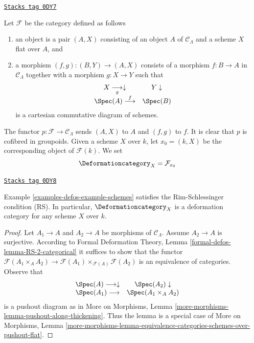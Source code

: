 \begin{example}[Schemes]

\label{examples-defos-example-schemes}
\href{https://stacks.math.columbia.edu/tag/0DY7}{\texttt{Stacks tag 0DY7}}

Let $\mathcal{F}$ be the category defined as follows
\begin{enumerate}
\item an object is a pair $(A, X)$ consisting of an
object $A$ of $\mathcal{C}_\Lambda$ and a scheme $X$ flat over $A$, and
\item a morphism $(f, g) : (B, Y) \to (A, X)$ consists of
a morphism $f : B \to A$ in $\mathcal{C}_\Lambda$ together
with a morphism $g : X \to Y$ such that
$$
\begin{array}{cc}X \underset{g}{\longrightarrow}\downarrow & Y \downarrow \\ \Spec(A) \overset{f}{\longrightarrow} & \Spec(B)\end{array}
$$
is a cartesian commutative diagram of schemes.
\end{enumerate}
The functor $p : \mathcal{F} \to \mathcal{C}_\Lambda$ sends $(A, X)$
to $A$ and $(f, g)$ to $f$. It is clear that $p$ is cofibred in groupoids.
Given a scheme $X$ over $k$, let $x_0 = (k, X)$ be the corresponding object
of $\mathcal{F}(k)$. We set
$$
\Deformationcategory_X = \mathcal{F}_{x_0}
$$
\end{example}

\begin{lemma}[Schemes RS]
\label{examples-defos-lemma-schemes-RS}
\href{https://stacks.math.columbia.edu/tag/0DY8}{\texttt{Stacks tag 0DY8}}

Example \ref{examples-defos-example-schemes}
satisfies the Rim-Schlessinger condition (RS).
In particular, $\Deformationcategory_X$ is a deformation category
for any scheme $X$ over $k$.
\end{lemma}

\begin{proof}
Let $A_1 \to A$ and $A_2 \to A$ be morphisms of $\mathcal{C}_\Lambda$.
Assume $A_2 \to A$ is surjective. According to
Formal Deformation Theory, Lemma
\ref{formal-defos-lemma-RS-2-categorical}
it suffices to show that the functor
$\mathcal{F}(A_1 \times_A A_2) \to
\mathcal{F}(A_1) \times_{\mathcal{F}(A)} \mathcal{F}(A_2)$
is an equivalence of categories.
Observe that
$$
\begin{array}{cc}\Spec(A) \longrightarrow\downarrow & \Spec(A_2) \downarrow \\ \Spec(A_1) \longrightarrow & \Spec(A_1 \times_A A_2)\end{array}
$$
is a pushout diagram as in More on Morphisms, Lemma
\ref{more-morphisms-lemma-pushout-along-thickening}.
Thus the lemma is a special case of More on Morphisms, Lemma
\ref{more-morphisms-lemma-equivalence-categories-schemes-over-pushout-flat}.
\end{proof}

